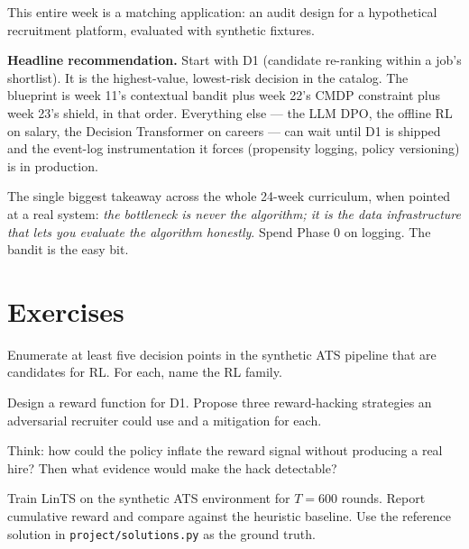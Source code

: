 \documentclass[11pt,oneside]{scrbook}
\begin{document}
\begin{matching}
This entire week is a matching application: an audit design for a
hypothetical recruitment platform, evaluated with synthetic fixtures.

\textbf{Headline recommendation.} Start with D1 (candidate re-ranking
within a job's shortlist). It is the highest-value, lowest-risk
decision in the catalog. The blueprint is week 11's contextual bandit
plus week 22's CMDP constraint plus week 23's shield, in that order.
Everything else --- the LLM DPO, the offline RL on salary, the Decision
Transformer on careers --- can wait until D1 is shipped and the
event-log instrumentation it forces (propensity logging, policy
versioning) is in production.

The single biggest takeaway across the whole 24-week curriculum, when
pointed at a real system: \emph{the bottleneck is never the
algorithm; it is the data infrastructure that lets you evaluate the
algorithm honestly}. Spend Phase 0 on logging. The bandit is the easy
bit.
\end{matching}

\chapter{Exercises}

\begin{exercise}[$\star$]
Enumerate at least five decision points in the synthetic ATS pipeline that
are candidates for RL. For each, name the RL family.
\end{exercise}

\begin{exercise}[$\star$$\star$]
Design a reward function for D1. Propose three reward-hacking
strategies an adversarial recruiter could use and a mitigation for each.
\begin{intuition}
Think: how could the policy inflate the reward signal without producing
a real hire? Then what evidence would make the hack detectable?
\end{intuition}
\end{exercise}

\begin{exercise}[$\star$$\star$]
Train LinTS on the synthetic ATS environment for $T=600$ rounds. Report
cumulative reward and compare against the heuristic baseline. Use the
reference solution in \texttt{project/solutions.py} as the ground truth.
\end{exercise}
\end{document}
